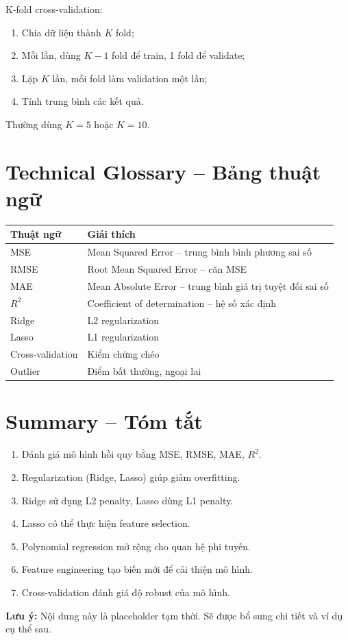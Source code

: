 K-fold cross-validation:
\begin{enumerate}
    \item Chia dữ liệu thành $K$ fold;
    \item Mỗi lần, dùng $K-1$ fold để train, 1 fold để validate;
    \item Lặp $K$ lần, mỗi fold làm validation một lần;
    \item Tính trung bình các kết quả.
\end{enumerate}

Thường dùng $K=5$ hoặc $K=10$.

\section{Technical Glossary -- Bảng thuật ngữ}

\begin{center}
\begin{tabular}{p{}p{}}
\toprule
\textbf{Thuật ngữ} & \textbf{Giải thích} \\
\midrule
MSE & Mean Squared Error -- trung bình bình phương sai số \\
RMSE & Root Mean Squared Error -- căn MSE \\
MAE & Mean Absolute Error -- trung bình giá trị tuyệt đối sai số \\
$R^2$ & Coefficient of determination -- hệ số xác định \\
Ridge & L2 regularization \\
Lasso & L1 regularization \\
Cross-validation & Kiểm chứng chéo \\
Outlier & Điểm bất thường, ngoại lai \\
\bottomrule
\end{tabular}
\end{center}

\section{Summary -- Tóm tắt}

\begin{enumerate}
    \item Đánh giá mô hình hồi quy bằng MSE, RMSE, MAE, $R^2$.
    \item Regularization (Ridge, Lasso) giúp giảm overfitting.
    \item Ridge sử dụng L2 penalty, Lasso dùng L1 penalty.
    \item Lasso có thể thực hiện feature selection.
    \item Polynomial regression mở rộng cho quan hệ phi tuyến.
    \item Feature engineering tạo biến mới để cải thiện mô hình.
    \item Cross-validation đánh giá độ robust của mô hình.
\end{enumerate}

\begin{ghinho}
\textbf{Lưu ý:} Nội dung này là placeholder tạm thời. Sẽ được bổ sung chi tiết và ví dụ cụ thể sau.
\end{ghinho}
